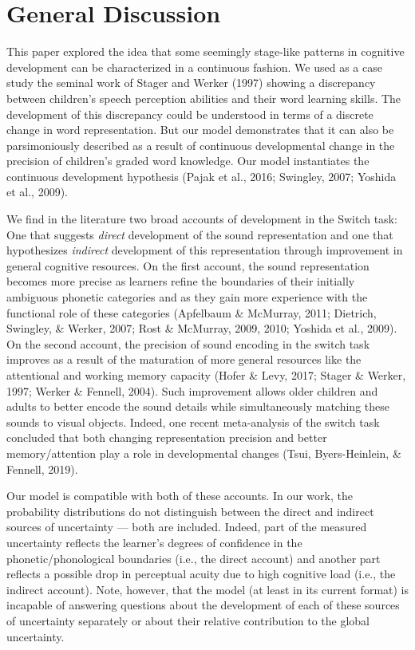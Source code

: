\documentclass[english,,man,floatsintext]{apa6}
\theoremstyle{definition}
\theoremstyle{definition}
\theoremstyle{definition}
\theoremstyle{remark}
\begin{document}
\section{General Discussion}\label{general-discussion}

This paper explored the idea that some seemingly stage-like patterns in
cognitive development can be characterized in a continuous fashion. We
used as a case study the seminal work of Stager and Werker (1997)
showing a discrepancy between children's speech perception abilities and
their word learning skills. The development of this discrepancy could be
understood in terms of a discrete change in word representation. But our
model demonstrates that it can also be parsimoniously described as a
result of continuous developmental change in the precision of children's
graded word knowledge. Our model instantiates the continuous development
hypothesis (Pajak et al., 2016; Swingley, 2007; Yoshida et al., 2009).

We find in the literature two broad accounts of development in the
Switch task: One that suggests \emph{direct} development of the sound
representation and one that hypothesizes \emph{indirect} development of
this representation through improvement in general cognitive resources.
On the first account, the sound representation becomes more precise as
learners refine the boundaries of their initially ambiguous phonetic
categories and as they gain more experience with the functional role of
these categories (Apfelbaum \& McMurray, 2011; Dietrich, Swingley, \&
Werker, 2007; Rost \& McMurray, 2009, 2010; Yoshida et al., 2009). On
the second account, the precision of sound encoding in the switch task
improves as a result of the maturation of more general resources like
the attentional and working memory capacity (Hofer \& Levy, 2017; Stager
\& Werker, 1997; Werker \& Fennell, 2004). Such improvement allows older
children and adults to better encode the sound details while
simultaneously matching these sounds to visual objects. Indeed, one
recent meta-analysis of the switch task concluded that both changing
representation precision and better memory/attention play a role in
developmental changes (Tsui, Byers-Heinlein, \& Fennell, 2019).

Our model is compatible with both of these accounts. In our work, the
probability distributions do not distinguish between the direct and
indirect sources of uncertainty --- both are included. Indeed, part of
the measured uncertainty reflects the learner's degrees of confidence in
the phonetic/phonological boundaries (i.e., the direct account) and
another part reflects a possible drop in perceptual acuity due to high
cognitive load (i.e., the indirect account). Note, however, that the
model (at least in its current format) is incapable of answering
questions about the development of each of these sources of uncertainty
separately or about their relative contribution to the global
uncertainty.
\end{document}
